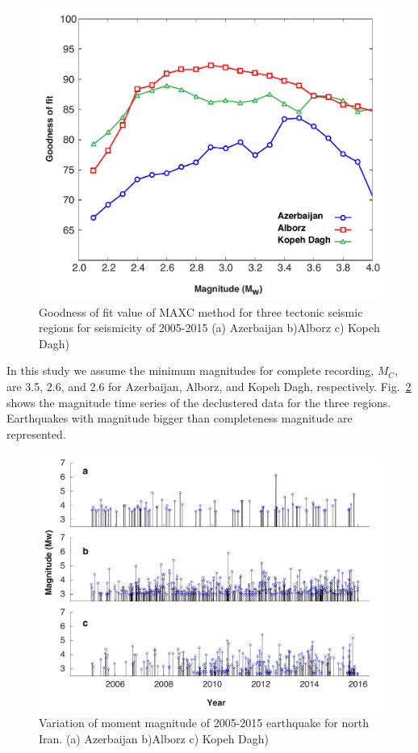 \begin{figure} [ht]
\centering
\includegraphics[scale=0.4]{figures/pdf/Figure03.pdf} 
\caption{Goodness of fit value of MAXC method for three tectonic seismic regions for seismicity of 2005-2015 (a) Azerbaijan b)Alborz c) Kopeh Dagh)}
\label{fig:completeness}
\end{figure} 





\noindent
In this study we assume the minimum magnitudes for complete recording, $M_C$, are 3.5, 2.6, and 2.6 for Azerbaijan, Alborz, and Kopeh Dagh, respectively. Fig.~\ref{fig:mag-time} shows the magnitude time series of the declustered data for the three regions. Earthquakes with magnitude bigger than completeness magnitude are represented. 

\begin{figure} [ht]
\centering
\includegraphics[scale=0.5]{figures/pdf/Figure04.pdf} 
\caption{Variation of moment magnitude of 2005-2015 earthquake for north Iran. (a) Azerbaijan b)Alborz c) Kopeh Dagh)}
\label{fig:mag-time}
\end{figure} 








